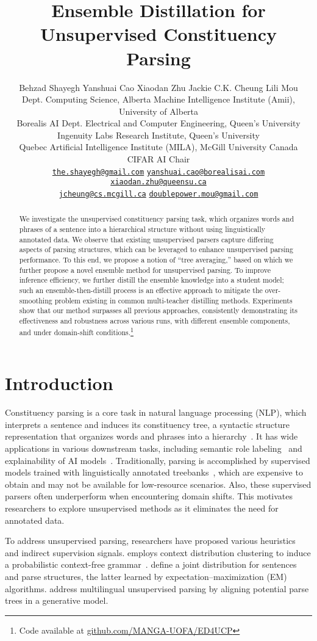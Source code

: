 \documentclass{article}
\title{Ensemble Distillation for Unsupervised Constituency Parsing}
\author{Behzad Shayegh \;\; Yanshuai Cao \;\; Xiaodan Zhu \;\; Jackie C.K. Cheung \;\; Lili Mou
\\
Dept. Computing Science, Alberta Machine Intelligence Institute (Amii), University of Alberta\\
Borealis AI\quad
Dept. Electrical and Computer Engineering, Queen’s University\\
Ingenuity Labs Research Institute, Queen’s University\\
Quebec Artificial Intelligence Institute (MILA), McGill University\quad
Canada CIFAR AI Chair\\
\texttt{\href{mailto:the.shayegh@gmail.com}{the.shayegh@gmail.com}} \quad
\texttt{\href{mailto:yanshuai.cao@borealisai.com}{yanshuai.cao@borealisai.com}}\quad
\texttt{\href{mailto:xiaodan.zhu@queensu.ca}{xiaodan.zhu@queensu.ca}}\\
\texttt{\href{mailto:jcheung@cs.mcgill.ca}{jcheung@cs.mcgill.ca}} \quad
\texttt{\href{mailto:doublepower.mou@gmail.com}{doublepower.mou@gmail.com}}
}
\begin{document}
\maketitle

\begin{abstract}
We investigate the unsupervised constituency parsing task, which organizes words and phrases of a sentence into a hierarchical structure without using linguistically annotated data. We observe that existing unsupervised parsers capture differing aspects of parsing structures, which can be leveraged to enhance unsupervised parsing performance.
To this end, we propose a notion of ``tree averaging,'' based on which we further propose a novel ensemble method for unsupervised parsing.
To improve inference efficiency, we further distill the ensemble knowledge into a student model; such an ensemble-then-distill process is an effective approach to mitigate the over-smoothing problem existing in common multi-teacher distilling methods.
Experiments show that our method surpasses all previous approaches, consistently demonstrating its effectiveness and robustness across various runs, with different ensemble components, and under domain-shift conditions.\footnote{Code available at \href{https://github.com/MANGA-UOFA/ED4UCP}{\url{github.com/MANGA-UOFA/ED4UCP}}}
\end{abstract}


\section{Introduction}
\label{sec:introduction}

Constituency parsing is a core task in natural language processing (NLP), which interprets a sentence and induces its constituency tree, a syntactic structure representation that organizes words and phrases into a hierarchy~\citep{constituencyTree}. It has wide applications in various downstream tasks, including semantic role labeling~\citep{mohammadshahi-henderson-2023-syntax} and explainability of AI models~\citep{tenney-etal-2019-bert}.
Traditionally, parsing is accomplished by supervised models trained with linguistically annotated treebanks~\citep{charniak-2000-maximum}, which are expensive to obtain and may not be available for low-resource scenarios.
Also, these supervised parsers often underperform when encountering domain shifts. 
This motivates researchers to explore unsupervised methods as it eliminates the need for annotated data.

To address unsupervised parsing, researchers have proposed various heuristics and indirect supervision signals. \citet{clark-2001-unsupervised} employs context distribution clustering to induce a probabilistic context-free grammar~\citep[PCFG;][]{Booth1969ProbabilisticRO}. \citet{klein-manning-2002-generative} define a joint distribution for sentences and parse structures, the latter learned by expectation--maximization (EM) algorithms. \citet{snyder2009unsupervised} address multilingual unsupervised parsing by aligning potential parse trees in a generative model.
\end{document}
